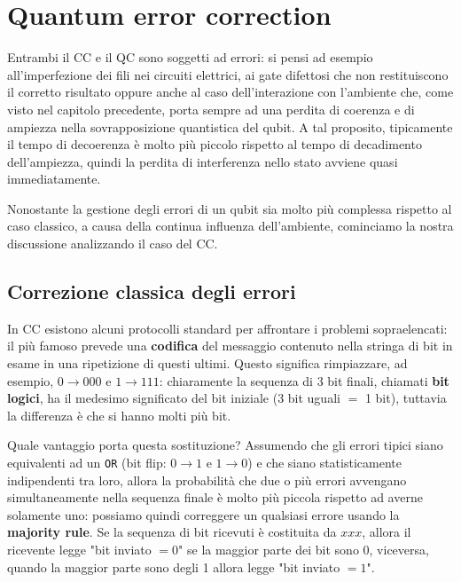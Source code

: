 \chapter{Quantum error correction}

\vspace{0.5cm}

\noindent Entrambi il CC e il QC sono soggetti ad errori: si pensi ad esempio all'imperfezione dei fili nei circuiti elettrici, ai gate difettosi che non restituiscono il corretto risultato oppure anche al caso dell'interazione con l'ambiente che, come visto nel capitolo precedente, porta sempre ad una perdita di coerenza e di ampiezza nella sovrapposizione quantistica del qubit. A tal proposito, tipicamente il tempo di decoerenza è molto più piccolo rispetto al tempo di decadimento dell'ampiezza, quindi la perdita di interferenza nello stato avviene quasi immediatamente. 

\noindent Nonostante la gestione degli errori di un qubit sia molto più complessa rispetto al caso classico, a causa della continua influenza dell'ambiente, cominciamo la nostra discussione analizzando il caso del CC.

\section{Correzione classica degli errori}\label{sec:classical_correction}
In CC esistono alcuni protocolli standard per affrontare i problemi sopraelencati: il più famoso prevede una \textbf{codifica} del messaggio contenuto nella stringa di bit in esame in una ripetizione di questi ultimi. Questo significa rimpiazzare, ad esempio, $0 \to 000$ e $1 \to 111$: chiaramente la sequenza di 3 bit finali, chiamati \textbf{bit logici}, ha il medesimo significato del bit iniziale (3 bit uguali $=$ 1 bit), tuttavia la differenza è che si hanno molti più bit. 

\noindent Quale vantaggio porta questa sostituzione? Assumendo che gli errori tipici siano equivalenti ad un \texttt{OR} (bit flip: $0 \to 1$ e $1 \to 0$) e che siano statisticamente indipendenti tra loro, allora la probabilità che due o più errori avvengano simultaneamente nella sequenza finale è molto più piccola rispetto ad averne solamente uno: possiamo quindi correggere un qualsiasi errore usando la \textbf{majority rule}. Se la sequenza di bit ricevuti è costituita da $xxx$, allora il ricevente legge "bit inviato $= 0$" se la maggior parte dei bit sono 0, viceversa, quando la maggior parte sono degli 1 allora legge "bit inviato $= 1$". 


